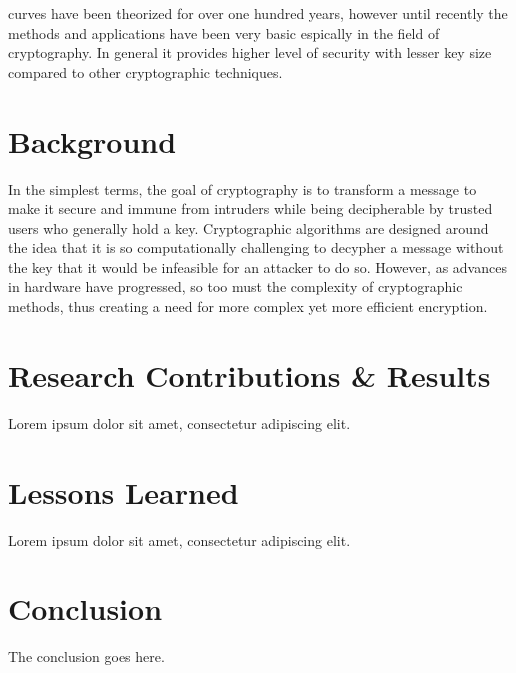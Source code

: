 \documentclass[journal,onecolumn]{IEEEtran}
\begin{document}
 curves have been theorized for over one hundred years, however until recently the methods and applications have been very basic espically in the field of cryptography. In general it provides higher level of security with lesser key size compared to other cryptographic techniques.

\section{Background}

In the simplest terms, the goal of cryptography is to transform a message to make it secure and immune from intruders while being decipherable by trusted users who generally hold a key. Cryptographic algorithms are designed around the idea that it is so computationally challenging to decypher a message without the key that it would be infeasible for an attacker to do so. However, as advances in hardware have progressed, so too must the complexity of cryptographic methods, thus creating a need for more complex yet more efficient encryption. 



\section{Research Contributions \& Results}

Lorem ipsum dolor sit amet, consectetur adipiscing elit.

\section{Lessons Learned}

Lorem ipsum dolor sit amet, consectetur adipiscing elit.

\section{Conclusion}
The conclusion goes here.


\end{document}
